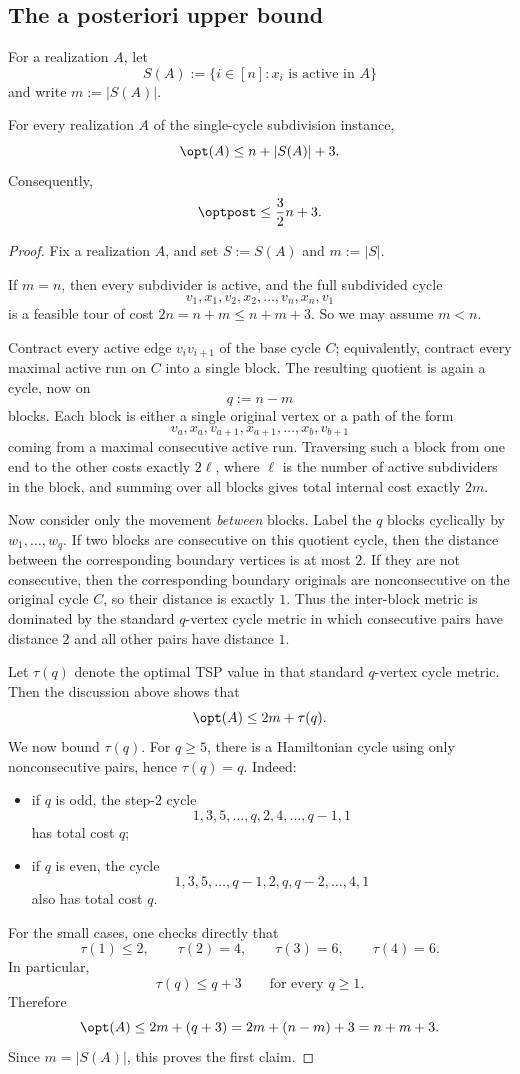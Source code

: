 \subsection*{The a posteriori upper bound}

For a realization $A$, let
\[
S(A):=\{i\in[n]: x_i\text{ is active in }A\}
\]
and write $m:=|S(A)|$.

\begin{proposition}\label{prop:single-post}
For every realization $A$ of the single-cycle subdivision instance,
\[
\opt(A)\le n+|S(A)|+3.
\]
Consequently,
\[
\optpost\le \frac32 n+3.
\]
\end{proposition}

\begin{proof}
Fix a realization $A$, and set $S:=S(A)$ and $m:=|S|$.

If $m=n$, then every subdivider is active, and the full subdivided cycle
\[
v_1,x_1,v_2,x_2,\dots,v_n,x_n,v_1
\]
is a feasible tour of cost $2n=n+m\le n+m+3$. So we may assume $m<n$.

Contract every active edge $v_iv_{i+1}$ of the base cycle $C$; equivalently, contract every maximal active run on $C$ into a single block. The resulting quotient is again a cycle, now on
\[
q:=n-m
\]
blocks. Each block is either a single original vertex or a path of the form
\[
v_a,x_a,v_{a+1},x_{a+1},\dots,x_b,v_{b+1}
\]
coming from a maximal consecutive active run. Traversing such a block from one end to the other costs exactly $2\ell$, where $\ell$ is the number of active subdividers in the block, and summing over all blocks gives total internal cost exactly $2m$.

Now consider only the movement \emph{between} blocks. Label the $q$ blocks cyclically by $w_1,\dots,w_q$. If two blocks are consecutive on this quotient cycle, then the distance between the corresponding boundary vertices is at most $2$. If they are not consecutive, then the corresponding boundary originals are nonconsecutive on the original cycle $C$, so their distance is exactly $1$. Thus the inter-block metric is dominated by the standard $q$-vertex cycle metric in which consecutive pairs have distance $2$ and all other pairs have distance $1$.

Let $\tau(q)$ denote the optimal TSP value in that standard $q$-vertex cycle metric. Then the discussion above shows that
\[
\opt(A)\le 2m+\tau(q).
\]
We now bound $\tau(q)$. For $q\ge 5$, there is a Hamiltonian cycle using only nonconsecutive pairs, hence $\tau(q)=q$. Indeed:
\begin{itemize}
    \item if $q$ is odd, the step-$2$ cycle
    \[
    1,3,5,\dots,q,2,4,\dots,q-1,1
    \]
    has total cost $q$;
    \item if $q$ is even, the cycle
    \[
    1,3,5,\dots,q-1,2,q,q-2,\dots,4,1
    \]
    also has total cost $q$.
\end{itemize}
For the small cases, one checks directly that
\[
\tau(1)\le 2,\qquad \tau(2)=4,\qquad \tau(3)=6,\qquad \tau(4)=6.
\]
In particular,
\[
\tau(q)\le q+3 \qquad \text{for every } q\ge 1.
\]
Therefore
\[
\opt(A)\le 2m+(q+3)=2m+(n-m)+3=n+m+3.
\]
Since $m=|S(A)|$, this proves the first claim.


\end{proof}
